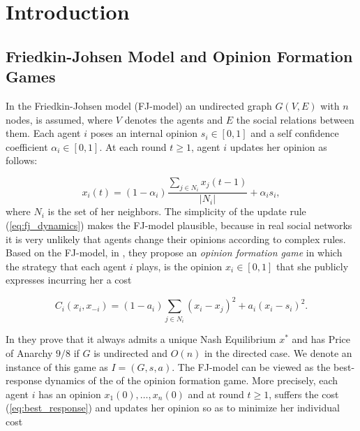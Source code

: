 \section{Introduction}

\subsection{Friedkin-Johsen Model and Opinion Formation Games}
In the Friedkin-Johsen model (FJ-model) an undirected graph $G(V,E)$ with $n$
nodes, is assumed, where $V$ denotes the agents and $E$ the social relations
between them. Each agent $i$ poses an internal opinion $s_i \in [0,1]$ and a self
confidence coefficient $\alpha_i \in[0,1]$. At each round $t \geq 1$,
agent $i$ updates her opinion as follows:

\begin{equation}\label{eq:fj_dynamics}
  x_i(t) = (1-\alpha_i) \frac{\sum_{j \in N_i}x_j(t-1)}{|N_i|} + \alpha_i s_i,
\end{equation}
where $N_i$ is the set of her neighbors. The simplicity of the update rule
(\ref{eq:fj_dynamics}) makes the FJ-model plausible, because in real social
networks it is very unlikely that agents change their opinions according
to complex rules.
Based on the FJ-model, in \cite{BKO11}, they propose an \emph{
  opinion formation game} in which the strategy that each agent
$i$ plays, is the opinion $x_i \in [0,1]$
that she publicly expresses incurring her a cost

\begin{equation}\label{eq:kleinberg_cost}
  C_i(x_i,x_{-i})=(1-a_i)\sum_{j \in N_i}(x_i -x_j)^2 + a_i(x_i-s_i)^2.
\end{equation}

In \cite{BK011} they prove that it always admits a unique
Nash Equilibrium $x^*$ and has Price of Anarchy $9/8$ if $G$ is
undirected and $O(n)$ in the directed case.  We denote an instance of this
game as $I=(G,s,a)$.
The FJ-model can be viewed as the best-response dynamics of the
of the opinion formation game.
%
More precisely, each agent $i$ has an opinion $x_1(0),\ldots,x_n(0)$ and
at round $t \geq 1$, suffers the cost (\ref{eq:best_response})
and updates her opinion so as to minimize her individual cost

